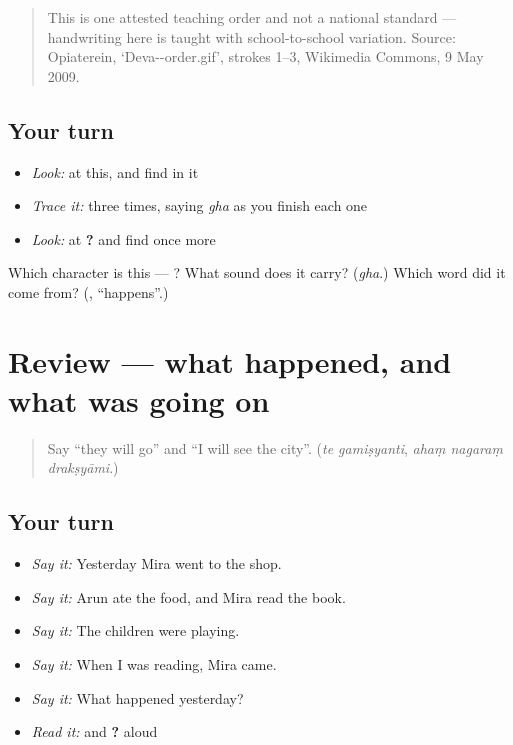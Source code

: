 \begin{quote}
This is one attested teaching order and not a national standard — handwriting here is taught with school-to-school variation. Source: Opiaterein, ‘Deva--order.gif’, strokes 1–3, Wikimedia Commons, 9 May 2009.
\end{quote}

\subsection*{Your turn}
\begin{itemize}
\raggedright
  \item \emph{Look:} at this, and find  in it
\end{itemize}

\begin{quote}
\end{quote}

\begin{itemize}
\raggedright
  \item \emph{Trace it:}  three times, saying \emph{gha} as you finish each one
  \item \emph{Look:} at \textbf{ ?} and find  once more
\end{itemize}

\begin{tcolorbox}[breakable,colback=teal!4,colframe=teal!35!black,title={Before you move on}]
Which character is this — ? What sound does it carry? (\emph{gha}.) Which word did it come from? (\textbf{}, \textquotedblleft{}happens\textquotedblright{}.)
\end{tcolorbox}
\section[(review)]{Review — what happened, and what was going on}

\label{lesson:SA-R276-what-happened}



\begin{quote}
Say \textquotedblleft{}they will go\textquotedblright{} and \textquotedblleft{}I will see the city\textquotedblright{}. (\emph{te gamiṣyanti}, \emph{ahaṃ nagaraṃ drakṣyāmi}.)
\end{quote}

\subsection*{Your turn}
\begin{itemize}
\raggedright
  \item \emph{Say it:} Yesterday Mira went to the shop.
  \item \emph{Say it:} Arun ate the food, and Mira read the book.
  \item \emph{Say it:} The children were playing.
  \item \emph{Say it:} When I was reading, Mira came.
  \item \emph{Say it:} What happened yesterday?
  \item \emph{Read it:} \textbf{} and \textbf{ ?} aloud
\end{itemize}

